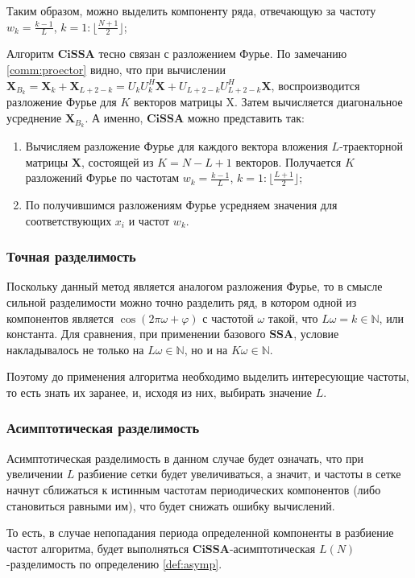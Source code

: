 \documentclass[a4paper, 11pt]{article}
\newcommand{\SSA}{\textbf{SSA}}
\newcommand{\CISSA}{\textbf{CiSSA}}
\begin{document}
Таким образом, можно выделить компоненту ряда, отвечающую за частоту $w_k = \frac{k-1}{L}$, $k = 1:\lfloor \frac{N+1}{2} \rfloor$;

Алгоритм $\CISSA$ тесно связан с разложением Фурье. По замечанию \ref{comm:proector} видно, что при вычислении $\mathbf X_{B_k} = \mathbf X_k + \mathbf X_{L+2-k} = U_k U_k^H \mathbf X + U_{L+2-k} U_{L+2-k}^H \mathbf X$, воспроизводится разложение Фурье для $K$ векторов матрицы $\mathrm X$. Затем вычисляется диагональное усреднение $\mathbf X_{B_k}$. А именно, $\CISSA$ можно представить так:
\begin{enumerate}
	\item Вычисляем разложение Фурье для каждого вектора вложения $L$-траекторной матрицы $\mathbf{X}$, состоящей из $K = N - L + 1$ векторов. Получается $K$ разложений Фурье по частотам $w_k = \frac{k-1}{L}$, $k = 1:\lfloor \frac{L+1}{2} \rfloor$;
	\item По получившимся разложениям Фурье усредняем значения для соответствующих $x_i$ и частот $w_k$.
\end{enumerate}

\subsubsection{Точная разделимость}
Поскольку данный метод является аналогом разложения Фурье, то в смысле сильной разделимости можно точно разделить ряд, в котором одной из компонентов является $\cos(2\pi \omega + \varphi)$ с частотой $\omega$ такой, что $L\omega = k \in \mathbb N$, или константа. Для сравнения, при применении базового $\SSA$, условие накладывалось не только на $L\omega \in \mathbb N$, но и на $K\omega \in \mathbb N$.

Поэтому до применения алгоритма необходимо выделить интересующие частоты, то есть знать их заранее, и, исходя из них, выбирать значение $L$.

\subsubsection{Асимптотическая разделимость}
Асимптотическая разделимость в данном случае будет означать, что при увеличении $L$ разбиение сетки будет увеличиваться, а значит, и частоты в сетке начнут сближаться к истинным частотам периодических компонентов (либо становиться равными им), что будет снижать ошибку вычислений.

То есть, в случае непопадания периода определенной компоненты в разбиение частот алгоритма, будет выполняться $\CISSA$-асимптотическая $L(N)$-разделимость по определению \ref{def:asymp}. 
\end{document}
